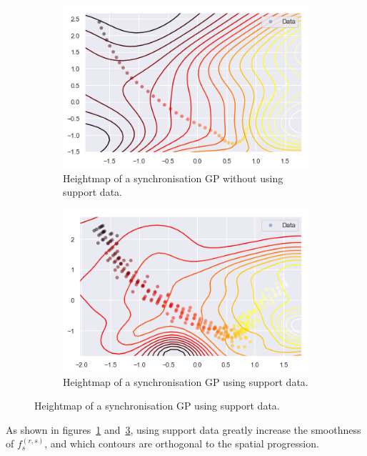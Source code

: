 \begin{figure}[H]
  \begin{subfigure}[b]{0.5\textwidth}
    \includegraphics[width=\textwidth]{figures/heat-without-support-data.png}
    \caption{Heightmap of a synchronisation GP without using support data.}
    \label{fig:heightmap-without-support}
  \end{subfigure}
  \begin{subfigure}[b]{0.5\textwidth}
    \includegraphics[width=\textwidth]{figures/heat-with-support-data.png}
    \caption{Heightmap of a synchronisation GP using support data.}
    \label{fig:heightmap-with-support}
  \end{subfigure}
\end{figure}

As shown in figures~\ref{fig:heightmap-without-support} and~\ref{fig:heightmap-with-support}, using support data greatly increase the smoothness of $f^{(r,s)}_s$, and which contours are orthogonal to the spatial progression.

